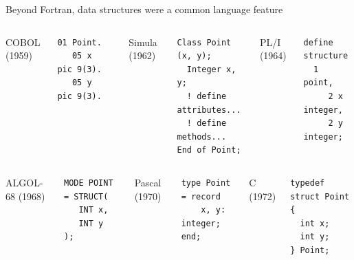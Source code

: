 \documentclass[aspectratio=169]{beamer}
\begin{document}
\begin{frame}[fragile]{Beyond Fortran, data structures were a common language feature}
\small
\vspace{0.5 cm}
\begin{columns}[t]
{\large COBOL (1959)}

\begin{verbatim}
01 Point.
   05 x    pic 9(3).
   05 y    pic 9(3).
\end{verbatim}

{\large Simula (1962)}

\begin{verbatim}
Class Point (x, y);
  Integer x, y;
  ! define attributes...
  ! define methods...
End of Point;
\end{verbatim}

{\large PL/I (1964)}

\begin{verbatim}
define structure
  1 point,
     2 x integer,
     2 y integer;
\end{verbatim}

\end{columns}

\vspace{1 cm}
\begin{columns}[t]
{\large ALGOL-68 (1968)}

\begin{verbatim}
MODE POINT = STRUCT(
   INT x,
   INT y
);
\end{verbatim}

{\large Pascal (1970)}

\begin{verbatim}
type Point = record
    x, y: integer;
end;
\end{verbatim}

{\large C (1972)}

\begin{verbatim}
typedef struct Point {
  int x;
  int y;
} Point;
\end{verbatim}

\end{columns}
\end{frame}
\end{document}
